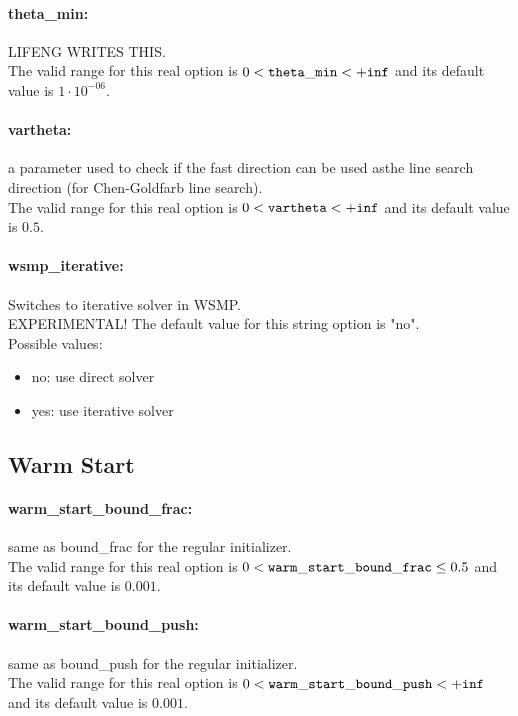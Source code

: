 \paragraph{theta\_min:}\label{sec:theta_min} LIFENG WRITES THIS. $\;$ \\
 The valid range for this real option is 
$0 <  {\tt theta\_min } <  {\tt +inf}$
and its default value is $1 \cdot 10^{-06}$.


\paragraph{vartheta:}\label{sec:vartheta} a parameter used to check if the fast direction can be used asthe line search direction (for Chen-Goldfarb line search). $\;$ \\
 The valid range for this real option is 
$0 <  {\tt vartheta } <  {\tt +inf}$
and its default value is $0.5$.


\paragraph{wsmp\_iterative:}\label{sec:wsmp_iterative} Switches to iterative solver in WSMP. $\;$ \\
 EXPERIMENTAL!
The default value for this string option is "no".
\\ 
Possible values:
\begin{itemize}
   \item no: use direct solver
   \item yes: use iterative solver
\end{itemize}

\subsection{Warm Start}
\label{sec:Warm_Start}
\paragraph{warm\_start\_bound\_frac:}\label{sec:warm_start_bound_frac} same as bound\_frac for the regular initializer. $\;$ \\
 The valid range for this real option is 
$0 <  {\tt warm\_start\_bound\_frac } \le 0.5$
and its default value is $0.001$.


\paragraph{warm\_start\_bound\_push:}\label{sec:warm_start_bound_push} same as bound\_push for the regular initializer. $\;$ \\
 The valid range for this real option is 
$0 <  {\tt warm\_start\_bound\_push } <  {\tt +inf}$
and its default value is $0.001$.



